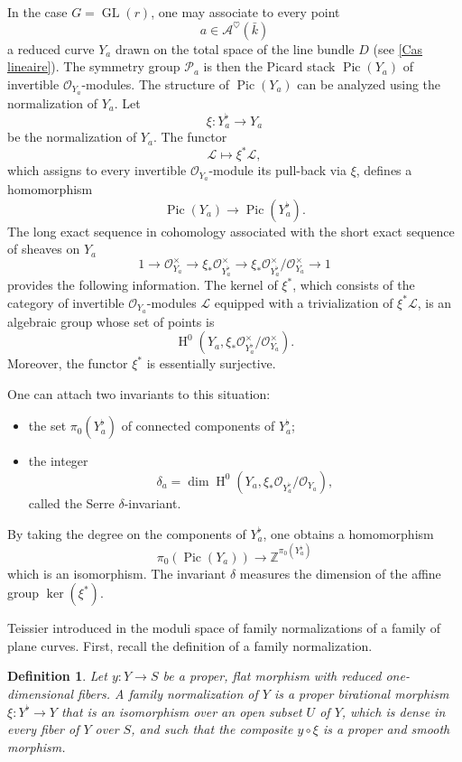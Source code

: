 \documentclass[12pt,english]{smfart}
\numberwithin{equation}{subsection}
\newtheorem{definition}[equation]{Definition}
\theoremstyle{remark}
\begin{document}
In the case $G=\operatorname{GL}(r)$, one may associate to every point 
$$a\in\mathcal{A}^\heartsuit(\bar{k})$$ 
a reduced curve $Y_a$ drawn on the total space of the line bundle $D$ (see \ref{Cas lineaire}). The symmetry group $\mathcal{P}_a$ is then the Picard stack $\operatorname{Pic}(Y_a)$ of invertible $\mathcal{O}_{Y_a}$-modules. The structure of $\operatorname{Pic}(Y_a)$ can be analyzed using the normalization of $Y_a$. Let 
$$\xi:Y_a^\flat\rightarrow Y_a$$ 
be the normalization of $Y_a$. The functor
$$\mathcal{L}\mapsto \xi^*\mathcal{L},$$
which assigns to every invertible $\mathcal{O}_{Y_a}$-module its pull-back via $\xi$, defines a homomorphism 
$$\operatorname{Pic}(Y_a)\rightarrow \operatorname{Pic}(Y_a^\flat).$$
The long exact sequence in cohomology associated with the short exact sequence of sheaves on $Y_a$
$$
1\rightarrow \mathcal{O}_{Y_a}^\times \rightarrow \xi_*\mathcal{O}_{Y_a^\flat}^\times \rightarrow \xi_*\mathcal{O}_{Y_a^\flat}^\times/\mathcal{O}_{Y_a}^\times\rightarrow 1
$$
provides the following information. The kernel of $\xi^*$, which consists of the category of invertible $\mathcal{O}_{Y_a}$-modules $\mathcal{L}$ equipped with a trivialization of $\xi^*\mathcal{L}$, is an algebraic group whose set of points is 
$$\operatorname{H}^0(Y_a,\xi_*\mathcal{O}_{Y_a^\flat}^\times/\mathcal{O}_{Y_a}^\times).$$ 
Moreover, the functor $\xi^*$ is essentially surjective.

One can attach two invariants to this situation:
\begin{itemize}
  \item the set $\pi_0(Y_a^\flat)$ of connected components of $Y_a^\flat$;
  \item the integer 
  $$\delta_a=\dim \operatorname{H}^0(Y_a,\xi_*\mathcal{O}_{Y_a^\flat}/\mathcal{O}_{Y_a}),$$ 
  called the Serre $\delta$-invariant.
\end{itemize}
By taking the degree on the components of $Y_a^\flat$, one obtains a homomorphism 
$$\pi_0(\operatorname{Pic}(Y_a))\rightarrow \mathbb{Z}^{\pi_0(Y_a^\flat)}$$ 
which is an isomorphism. The invariant $\delta$ measures the dimension of the affine group $\ker(\xi^*)$.

Teissier introduced in \cite{T} the moduli space of family normalizations of a family of plane curves. First, recall the definition of a family normalization.

\begin{definition}\label{normalisation en famille}
Let $y:Y\rightarrow S$ be a proper, flat morphism with reduced one-dimensional fibers. A family normalization of $Y$ is a proper birational morphism $\xi:Y^\flat\rightarrow Y$ that is an isomorphism over an open subset $U$ of $Y$, which is dense in every fiber of $Y$ over $S$, and such that the composite $y\circ \xi$ is a proper and smooth morphism.
\end{definition}
\end{document}
